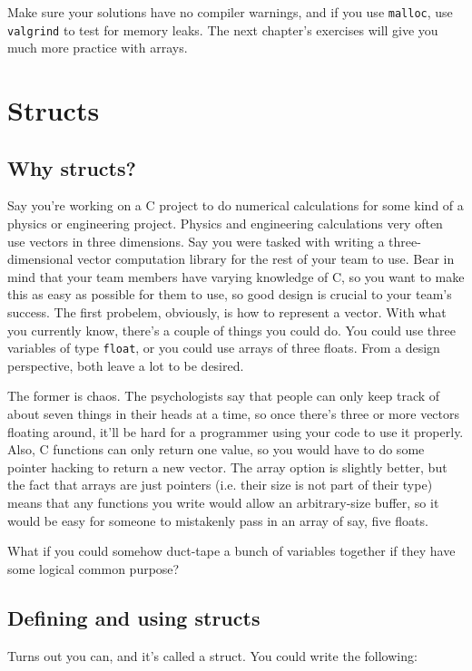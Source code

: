 \documentclass[ebook,11pt,oneside,openany]{memoir}
\newcommand{\cf}[1]{\texttt{#1}}
\begin{document}
Make sure your solutions have no compiler warnings, and if you use \cf{malloc}, use \cf{valgrind} to test for memory leaks. The next chapter's exercises will give you much more practice with arrays.

\chapter{Structs}
\label{ch:struct}
\section{Why structs?}

Say you're working on a C project to do numerical calculations for some kind of a physics or engineering project. Physics and engineering calculations very often use vectors in three dimensions. Say you were tasked with writing a three-dimensional vector computation library for the rest of your team to use. Bear in mind that your team members have varying knowledge of C, so you want to make this as easy as possible for them to use, so good design is crucial to your team's success. The first probelem, obviously, is how to represent a vector. With what you currently know, there's a couple of things you could do. You could use three variables of type \texttt{float}, or you could use arrays of three floats. From a design perspective, both leave a lot to be desired.

The former is chaos. The psychologists say that people can only keep track of about seven things in their heads at a time, so once there's three or more vectors floating around, it'll be hard for a programmer using your code to use it properly. Also, C functions can only return one value, so you would have to do some pointer hacking to return a new vector. The array option is slightly better, but the fact that arrays are just pointers (i.e. their size is not part of their type) means that any functions you write would allow an arbitrary-size buffer, so it would be easy for someone to mistakenly pass in an array of say, five floats.

What if you could somehow duct-tape a bunch of variables together if they have some logical common purpose?

\section{Defining and using structs}
Turns out you can, and it's called a struct. You could write the following: 
\end{document}

